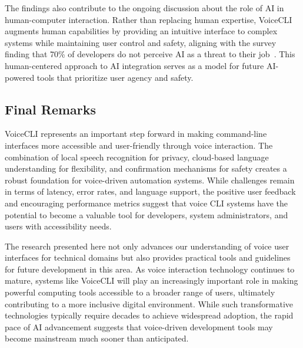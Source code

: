 \documentclass[a4paper,12pt]{article}
\begin{document}
The findings also contribute to the ongoing discussion about the role of AI in human-computer interaction. Rather than replacing human expertise, VoiceCLI augments human capabilities by providing an intuitive interface to complex systems while maintaining user control and safety, aligning with the survey finding that 70\% of developers do not perceive AI as a threat to their job~\cite{ref2}. This human-centered approach to AI integration serves as a model for future AI-powered tools that prioritize user agency and safety.

\subsection{Final Remarks}

VoiceCLI represents an important step forward in making command-line interfaces more accessible and user-friendly through voice interaction. The combination of local speech recognition for privacy, cloud-based language understanding for flexibility, and confirmation mechanisms for safety creates a robust foundation for voice-driven automation systems. While challenges remain in terms of latency, error rates, and language support, the positive user feedback and encouraging performance metrics suggest that voice CLI systems have the potential to become a valuable tool for developers, system administrators, and users with accessibility needs.

The research presented here not only advances our understanding of voice user interfaces for technical domains but also provides practical tools and guidelines for future development in this area. As voice interaction technology continues to mature, systems like VoiceCLI will play an increasingly important role in making powerful computing tools accessible to a broader range of users, ultimately contributing to a more inclusive digital environment. While such transformative technologies typically require decades to achieve widespread adoption, the rapid pace of AI advancement suggests that voice-driven development tools may become mainstream much sooner than anticipated.  


\newpage
\end{document}
